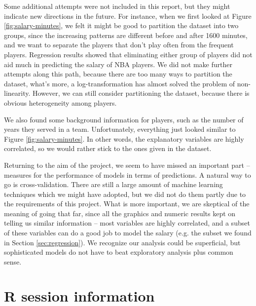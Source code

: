 \documentclass[english]{article}
\begin{document}
Some additional attempts were not included in this report, but they
might indicate new directions in the future. For instance, when we
first looked at Figure \ref{fig:salary-minutes}, we felt it might
be good to partition the dataset into two groups, since the increasing
patterns are different before and after 1600 minutes, and we want
to separate the players that don't play often from the frequent players.
Regression results showed that eliminating either group of players
did not aid much in predicting the salary of NBA players. We did not
make further attempts along this path, because there are too many
ways to partition the dataset, what's more, a log-transformation has
almost solved the problem of non-linearity. However, we can still
consider partitioning the dataset, because there is obvious heterogeneity
among players.

We also found some background information for players, such as the
number of years they served in a team. Unfortunately, everything just
looked similar to Figure \ref{fig:salary-minutes}. In other words,
the explanatory variables are highly correlated, so we would rather
stick to the ones given in the dataset.

Returning to the aim of the project, we seem to have missed an important
part -- measures for the performance of models in terms of predictions.
A natural way to go is cross-validation. There are still a large amount
of machine learning techniques which we might have adopted, but we
did not do them partly due to the requirements of this project. What
is more important, we are skeptical of the meaning of going that far,
since all the graphics and numeric results kept on telling us similar
information -- most variables are highly correlated, and a subset
of these variables can do a good job to model the salary (e.g. the
subset we found in Section \ref{sec:regression}). We recognize our
analysis could be superficial, but sophisticated models do not have
to beat exploratory analysis plus common sense.





\appendix

\section{R session information}
\end{document}
